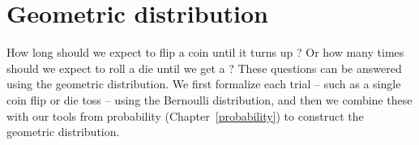 %
%
%
%




\section{Geometric distribution}
\label{geomDist}

How long should we expect to flip a coin until it turns up ? Or how many times should we expect to roll a die until we get a ? These questions can be answered using the geometric distribution. We first formalize each trial -- such as a single coin flip or die toss -- using the Bernoulli distribution, and then we combine these with our tools from probability (Chapter~\ref{probability}) to construct the geometric distribution.

